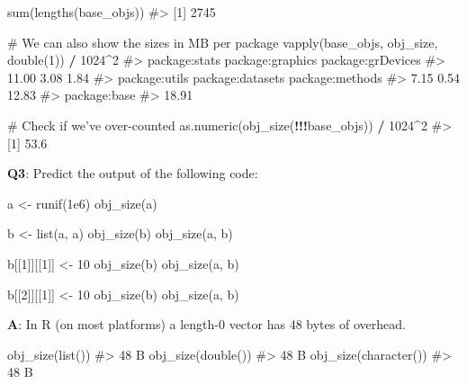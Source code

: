 \documentclass[
]{krantz}
\makeatletter
\newenvironment{Shaded}{\begin{snugshade}}{\end{snugshade}}
\newcommand{\CommentTok}[1]{\textcolor[rgb]{0.56,0.35,0.01}{\textit{#1}}}
\newcommand{\DecValTok}[1]{\textcolor[rgb]{0.00,0.00,0.81}{#1}}
\newcommand{\FloatTok}[1]{\textcolor[rgb]{0.00,0.00,0.81}{#1}}
\newcommand{\KeywordTok}[1]{\textcolor[rgb]{0.13,0.29,0.53}{\textbf{#1}}}
\newcommand{\NormalTok}[1]{#1}
\newcommand{\OperatorTok}[1]{\textcolor[rgb]{0.81,0.36,0.00}{\textbf{#1}}}
\newcommand{\StringTok}[1]{\textcolor[rgb]{0.31,0.60,0.02}{#1}}
\newenvironment{kframe}{%
\medskip{}
\setlength{\fboxsep}{.8em}
 \def\at@end@of@kframe{}%
 \ifinner\ifhmode%
  \def\at@end@of@kframe{\end{minipage}}%
  \begin{minipage}{\columnwidth}%
 \fi\fi%
 \def\FrameCommand##1{\hskip\@totalleftmargin \hskip-\fboxsep
 \colorbox{shadecolor}{##1}\hskip-\fboxsep
     \hskip-\linewidth \hskip-\@totalleftmargin \hskip\columnwidth}%
 \MakeFramed {\advance\hsize-\width
   \@totalleftmargin\z@ \linewidth\hsize
   \@setminipage}}%
 {\par\unskip\endMakeFramed%
 \at@end@of@kframe}
\renewenvironment{Shaded}{\begin{kframe}}{\end{kframe}}
\renewcommand{\KeywordTok} [1]{\textcolor[rgb]{0.00,0.44,0.13}{{#1}}}
\renewcommand{\DecValTok}  [1]{\textcolor[rgb]{0.25,0.63,0.44}{{#1}}}
\renewcommand{\FloatTok}   [1]{\textcolor[rgb]{0.25,0.63,0.44}{{#1}}}
\renewcommand{\StringTok}  [1]{\textcolor[rgb]{0.25,0.44,0.63}{{#1}}}
\renewcommand{\CommentTok} [1]{\textcolor[rgb]{0.38,0.63,0.69}{{#1}}}
\renewcommand{\NormalTok}  [1]{{#1}}
\makeatother
\begin{document}
\begin{Shaded}
\begin{Highlighting}[]
\KeywordTok{sum}\NormalTok{(}\KeywordTok{lengths}\NormalTok{(base_objs))}
\CommentTok{#> [1] 2745}

\CommentTok{# We can also show the sizes in MB per package}
\KeywordTok{vapply}\NormalTok{(base_objs, obj_size, }\KeywordTok{double}\NormalTok{(}\DecValTok{1}\NormalTok{)) }\OperatorTok{/}\StringTok{ }\DecValTok{1024}\OperatorTok{^}\DecValTok{2}
\CommentTok{#>     package:stats  package:graphics package:grDevices }
\CommentTok{#>             11.00              3.08              1.84 }
\CommentTok{#>     package:utils  package:datasets   package:methods }
\CommentTok{#>              7.15              0.54             12.83 }
\CommentTok{#>      package:base }
\CommentTok{#>             18.91}

\CommentTok{# Check if we've over-counted}
\KeywordTok{as.numeric}\NormalTok{(}\KeywordTok{obj_size}\NormalTok{(}\OperatorTok{!!!}\NormalTok{base_objs)) }\OperatorTok{/}\StringTok{ }\DecValTok{1024}\OperatorTok{^}\DecValTok{2}
\CommentTok{#> [1] 53.6}
\end{Highlighting}
\end{Shaded}

\textbf{{Q3}}: Predict the output of the following code:

\begin{Shaded}
\begin{Highlighting}[]
\NormalTok{a <-}\StringTok{ }\KeywordTok{runif}\NormalTok{(}\FloatTok{1e6}\NormalTok{)}
\KeywordTok{obj_size}\NormalTok{(a)}

\NormalTok{b <-}\StringTok{ }\KeywordTok{list}\NormalTok{(a, a)}
\KeywordTok{obj_size}\NormalTok{(b)}
\KeywordTok{obj_size}\NormalTok{(a, b)}

\NormalTok{b[[}\DecValTok{1}\NormalTok{]][[}\DecValTok{1}\NormalTok{]] <-}\StringTok{ }\DecValTok{10}
\KeywordTok{obj_size}\NormalTok{(b)}
\KeywordTok{obj_size}\NormalTok{(a, b)}

\NormalTok{b[[}\DecValTok{2}\NormalTok{]][[}\DecValTok{1}\NormalTok{]] <-}\StringTok{ }\DecValTok{10}
\KeywordTok{obj_size}\NormalTok{(b)}
\KeywordTok{obj_size}\NormalTok{(a, b)}
\end{Highlighting}
\end{Shaded}

\textbf{{A}}: In R (on most platforms) a length-0
vector has 48 bytes of overhead.

\begin{Shaded}
\begin{Highlighting}[]
\KeywordTok{obj_size}\NormalTok{(}\KeywordTok{list}\NormalTok{())}
\CommentTok{#> 48 B}
\KeywordTok{obj_size}\NormalTok{(}\KeywordTok{double}\NormalTok{())}
\CommentTok{#> 48 B}
\KeywordTok{obj_size}\NormalTok{(}\KeywordTok{character}\NormalTok{())}
\CommentTok{#> 48 B}
\end{Highlighting}
\end{Shaded}
\end{document}

